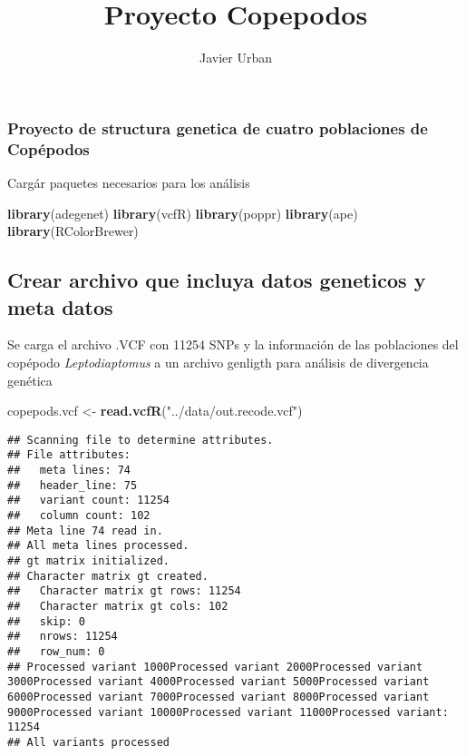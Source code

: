 \documentclass[]{article}
\title{Proyecto Copepodos}
\author{Javier Urban}
\date{}
\newenvironment{Shaded}{\begin{snugshade}}{\end{snugshade}}
\newcommand{\KeywordTok}[1]{\textcolor[rgb]{0.13,0.29,0.53}{\textbf{#1}}}
\newcommand{\NormalTok}[1]{#1}
\newcommand{\StringTok}[1]{\textcolor[rgb]{0.31,0.60,0.02}{#1}}
\begin{document}
\maketitle

\hypertarget{proyecto-de-structura-genetica-de-cuatro-poblaciones-de-copuxe9podos}{%
\subsubsection{Proyecto de structura genetica de cuatro poblaciones de
Copépodos}\label{proyecto-de-structura-genetica-de-cuatro-poblaciones-de-copuxe9podos}}

Cargár paquetes necesarios para los análisis

\begin{Shaded}
\begin{Highlighting}[]
\KeywordTok{library}\NormalTok{(adegenet)}
\KeywordTok{library}\NormalTok{(vcfR)}
\KeywordTok{library}\NormalTok{(poppr)}
\KeywordTok{library}\NormalTok{(ape)}
\KeywordTok{library}\NormalTok{(RColorBrewer)}
\end{Highlighting}
\end{Shaded}

\hypertarget{crear-archivo-que-incluya-datos-geneticos-y-meta-datos}{%
\subsection{Crear archivo que incluya datos geneticos y meta
datos}\label{crear-archivo-que-incluya-datos-geneticos-y-meta-datos}}

Se carga el archivo .VCF con 11254 SNPs y la información de las
poblaciones del copépodo \emph{Leptodiaptomus} a un archivo genligth
para análisis de divergencia genética

\begin{Shaded}
\begin{Highlighting}[]
\NormalTok{copepods.vcf <-}\StringTok{ }\KeywordTok{read.vcfR}\NormalTok{(}\StringTok{"../data/out.recode.vcf"}\NormalTok{)}
\end{Highlighting}
\end{Shaded}

\begin{verbatim}
## Scanning file to determine attributes.
## File attributes:
##   meta lines: 74
##   header_line: 75
##   variant count: 11254
##   column count: 102
## Meta line 74 read in.
## All meta lines processed.
## gt matrix initialized.
## Character matrix gt created.
##   Character matrix gt rows: 11254
##   Character matrix gt cols: 102
##   skip: 0
##   nrows: 11254
##   row_num: 0
## Processed variant 1000Processed variant 2000Processed variant 3000Processed variant 4000Processed variant 5000Processed variant 6000Processed variant 7000Processed variant 8000Processed variant 9000Processed variant 10000Processed variant 11000Processed variant: 11254
## All variants processed
\end{verbatim}
\end{document}
